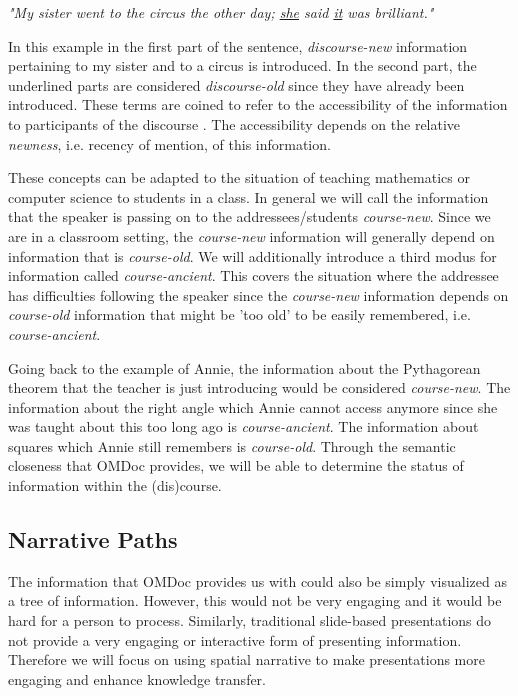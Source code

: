\documentclass{llncs}
\begin{document}
\begin{center}
\textit{"My sister went to the circus the other day; \underline{she} said \underline{it} was brilliant."}
\end{center}

In this example in the first part of the sentence, \textit{discourse-new} information pertaining to my sister and to a circus is introduced. In the second part, the underlined parts are considered \textit{discourse-old} since they have already been introduced. These terms are coined to refer to the accessibility of the information to participants of the discourse \cite{Newness:npentrel14}. The accessibility depends on the relative \textit{newness}, i.e. recency of mention, of this information.

These concepts can be adapted to the situation of teaching mathematics or computer science to students in a class. In general we will call the information that the speaker is passing on to the addressees/students \textit{course-new}. Since we are in a classroom setting, the \textit{course-new} information will generally depend on information that is \textit{course-old}. We will additionally introduce a third modus for information called \textit{course-ancient}. This covers the situation where the addressee has difficulties following the speaker since the \textit{course-new} information depends on \textit{course-old} information that might be 'too old' to be easily remembered, i.e. \textit{course-ancient}.

Going back to the example of Annie, the information about the Pythagorean theorem that the teacher is just introducing would be considered \textit{course-new}. The information about the right angle which Annie cannot access anymore since she was taught about this too long ago is \textit{course-ancient}. The information about squares which Annie still remembers is \textit{course-old}. Through the semantic closeness that OMDoc provides, we will be able to determine the status of information within the (dis)course.

\subsection{Narrative Paths}
\label{sec:narrativePaths}

The information that OMDoc provides us with could also be simply visualized as a tree of information. However, this would not be very engaging and it would be hard for a person to process. Similarly, traditional slide-based presentations do not provide a very engaging or interactive form of presenting information. Therefore we will focus on using spatial narrative to make presentations more engaging and enhance knowledge transfer. 
\end{document}
